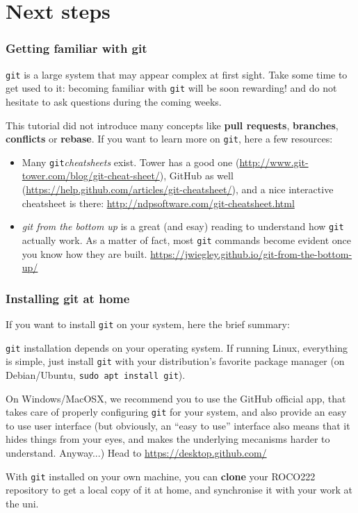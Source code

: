 \documentclass{instructions}
\newcommand{\git}{\texttt{git}\xspace}
\begin{document}
\part{Next steps}


\section{Getting familiar with git}

\git is a large system that may appear complex at first sight. Take some time to
get used to it: becoming familiar with \git will be soon rewarding! and do not
hesitate to ask questions during the coming weeks.

This tutorial did not introduce many concepts like \textbf{pull requests}, \textbf{branches},
\textbf{conflicts} or \textbf{rebase}. If you want to learn more on \git, here a
few resources:

\begin{itemize}
    \item Many \git \emph{cheatsheets} exist. Tower has a good one
        (\url{http://www.git-tower.com/blog/git-cheat-sheet/}), GitHub as well
        (\url{https://help.github.com/articles/git-cheatsheet/}), and a nice
        interactive cheatsheet is there:
        \url{http://ndpsoftware.com/git-cheatsheet.html}
    \item \emph{git from the bottom up} is a great (and esay) reading to understand how
        \git actually work. As a matter of fact, most \git commands become evident once you know how they are
        built. \url{https://jwiegley.github.io/git-from-the-bottom-up/}
\end{itemize}


\section{Installing git at home}


If you want to install \git on your system, here the brief
summary:

\git installation depends on your operating system. If running Linux,
everything is simple, just install \git with your distribution's
favorite package manager (on Debian/Ubuntu,
\texttt{sudo apt install git}).

On Windows/MacOSX, we recommend you to use the GitHub official app, that takes
care of properly configuring \git for your system, and also provide an
easy to use user interface (but obviously, an ``easy to use'' interface also means
that it hides things from your eyes, and makes the underlying mecanisms harder to
understand. Anyway...) Head to \url{https://desktop.github.com/}


With \git installed on your own machine, you can \textbf{clone} your ROCO222
repository to get a local copy of it at home, and synchronise it with your work
at the uni.
\end{document}

